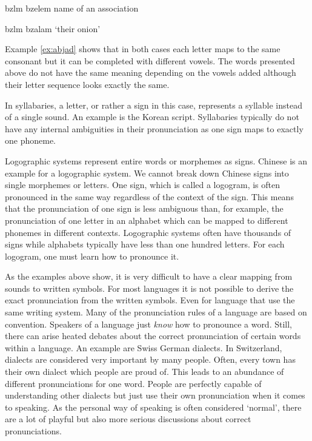 \begin{description}
\begin{covsubexamples}[preamble={The example shows Hebrew words that are first mapped to the Latin alphabet, then to the Latin alphabet including vowels and in the end to the English translation.}]
\label{ex:abjad}
\item {} \>\> bzlm \>\> bzelem \>\> name of an association
\item {} \>\> bzlm \>\> bzalam \>\> `their onion'
\end{covsubexamples}

Example \ref{ex:abjad} shows that in both cases each letter maps to the same consonant but it can be completed with different vowels. The words presented above do not have the same meaning depending on the vowels added although their letter sequence looks exactly the same. 

\item[\textsc{Syllabary}] In syllabaries, a letter, or rather a sign in this case, represents a syllable instead of a single sound. An example is the Korean script. Syllabaries typically do not have any internal ambiguities in their pronunciation as one sign maps to exactly one phoneme.   

\item[\textsc{Logographic systems}] Logographic systems represent entire words or morphemes as signs. Chinese is an example for a logographic system. We cannot break down Chinese signs into single morphemes or letters. One sign, which is called a logogram, is often pronounced in the same way regardless of the context of the sign. This means that the pronunciation of one sign is less ambiguous than, for example, the pronunciation of one letter in an alphabet which can be mapped to different phonemes in different contexts. Logographic systems often have thousands of signs while alphabets typically have less than one hundred letters. For each logogram, one must learn how to pronounce it.
\end{description}

As the examples above show, it is very difficult to have a clear mapping from sounds to written symbols. For most languages it is not possible to derive the exact pronunciation from the written symbols. Even for language that use the same writing system. Many of the pronunciation rules of a language are based on convention. Speakers of a language just \textit{know} how to pronounce a word. Still, there can arise heated debates about the correct pronunciation of certain words within a language. An example are Swiss German dialects. In Switzerland, dialects are considered very important by many people. Often, every town has their own dialect which people are proud of. This leads to an abundance of different pronunciations for one word. People are perfectly capable of understanding other dialects but just use their own pronunciation when it comes to speaking. As the personal way of speaking is often considered `normal', there are a lot of playful but also more serious discussions about correct pronunciations. 

